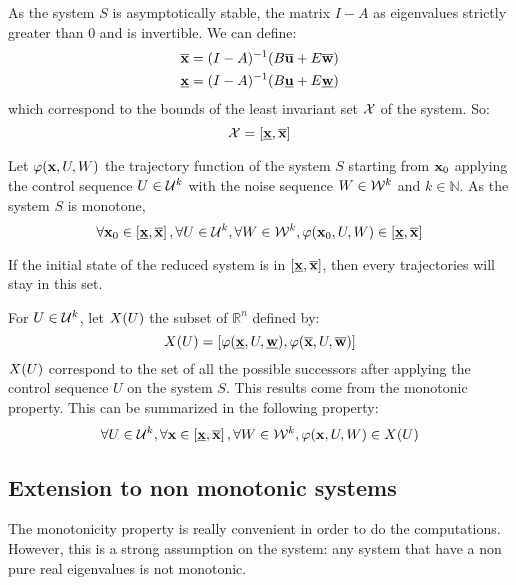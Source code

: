 As the system $S$ is asymptotically stable, the matrix $I-A$ as eigenvalues strictly greater than $0$ and is invertible.
We can define:
\begin{equation}
\begin{split}
\overline{ \mathbf{x}} &= (I-A)^{-1} (B \overline{ \mathbf{u}} + E \overline{ \mathbf{w}})\\
\underline{ \mathbf{x}} &= (I-A)^{-1} (B \underline{ \mathbf{u}} + E \underline{ \mathbf{w}})\\
\end{split}
\end{equation}
which correspond to the bounds of the least invariant set $\mathcal{X}$ of the system.
So:
\begin{equation}
\mathcal{X} = \left[ \underline{ \mathbf{x}}, \overline{ \mathbf{x}} \right]
\end{equation}

Let $\varphi( \mathbf{x},U,W)$ the trajectory function of the system $S$ starting from $ \mathbf{x}_0$
applying the control sequence $U \in {\mathcal{U}}^k$
with the noise sequence $W \in {\mathcal{W}}^k$ and $k \in \mathbb{N}$.
As the system $S$ is monotone,
\begin{equation}
\forall  \mathbf{x}_0 \in \left [\underline{ \mathbf{x}}, \overline{ \mathbf{x}} \right ],
\forall U \in {\mathcal{U}}^k,
\forall W \in {\mathcal{W}}^k,
\varphi ( \mathbf{x}_0,U,W)
\in \left[ \underline{ \mathbf{x}}, \overline{ \mathbf{x}} \right]
\end{equation}

If the initial state of the reduced system is in $\left[ \underline{ \mathbf{x}}, \overline{ \mathbf{x}} \right]$, then every trajectories will stay in this set.

For $U \in \mathcal{U}^k$, let $X(U)$ the subset of $\mathbb{R}^n$ defined by:
\begin{equation}
X(U) = \left[ 
\varphi (\underline{ \mathbf{x}},U,\underline{ \mathbf{w}}),
\varphi (\overline{ \mathbf{x}},U,\overline{ \mathbf{w}})
\right]
\end{equation}
$X(U)$ correspond to the set of all the possible successors after applying the control sequence $U$ on the system $S$. This results come from the monotonic property.
This can be summarized in the following property:
\begin{equation}
\forall U \in \mathcal{U}^k,
\forall  \mathbf{x} \in \left[\underline{ \mathbf{x}}, \overline{ \mathbf{x}} \right],
\forall W \in \mathcal{W}^k,
\varphi ( \mathbf{x},U,W) \in X(U)
\end{equation}


\subsection{Extension to non monotonic systems}
The monotonicity property is really convenient in order to do the computations.
However, this is a strong assumption on the system: any system that have a non pure real eigenvalues is not monotonic.

